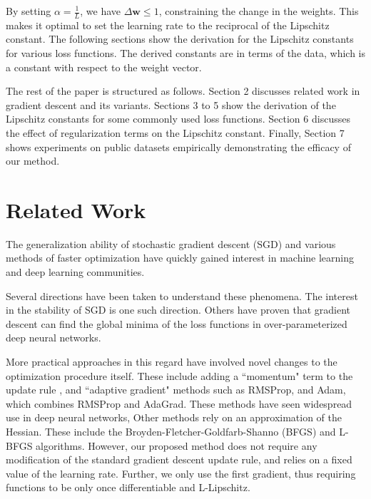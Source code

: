 \documentclass[sigconf,authordraft]{acmart}
\begin{document}
By setting $\alpha = \frac{1}{L}$, we have $\Delta \textbf{w} \leq 1$, constraining the change in the weights. This makes it optimal to set the learning rate to the reciprocal of the Lipschitz constant. The following sections show the derivation for the Lipschitz constants for various loss functions. The derived constants are in terms of the data, which is a constant with respect to the weight vector.

The rest of the paper is structured as follows. Section 2 discusses related work in gradient descent and its variants. Sections 3 to 5 show the derivation of the Lipschitz constants for some commonly used loss functions. Section 6 discusses the effect of regularization terms on the Lipschitz constant. Finally, Section 7 shows experiments on public datasets empirically demonstrating the efficacy of our method.


\section{Related Work}
The generalization ability of stochastic gradient descent (SGD) and various methods of faster optimization have quickly gained interest in machine learning and deep learning communities. 

Several directions have been taken to understand these phenomena. The interest in the stability of SGD is one such direction\cite{kuzborskij2017data}\cite{hardt2015train}. Others have proven that gradient descent can find the global minima of the loss functions in over-parameterized deep neural networks\cite{zou2018stochastic}\cite{du2018gradient}. 

More practical approaches in this regard have involved novel changes to the optimization procedure itself. These include adding a ``momentum" term to the update rule \cite{sutskever2013importance}, and ``adaptive gradient" methods such as RMSProp\cite{tieleman2012lecture}, and Adam\cite{kingma2014adam}, which combines RMSProp and AdaGrad\cite{duchi2011adaptive}. These methods have seen widespread use in deep neural networks\cite{radford2015unsupervised}\cite{xu2015show}\cite{bahar2017empirical},  Other methods rely on an approximation of the Hessian. These include the Broyden-Fletcher-Goldfarb-Shanno (BFGS) \cite{broyden1970convergence}\cite{fletcher1970new}\cite{goldfarb1970family}\cite{shanno1970conditioning} and L-BFGS\cite{liu1989limited} algorithms. However, our proposed method does not require any modification of the standard gradient descent update rule, and relies on a fixed value of the learning rate. Further, we only use the first gradient, thus requiring functions to be only once differentiable and L-Lipschitz.
\end{document}
